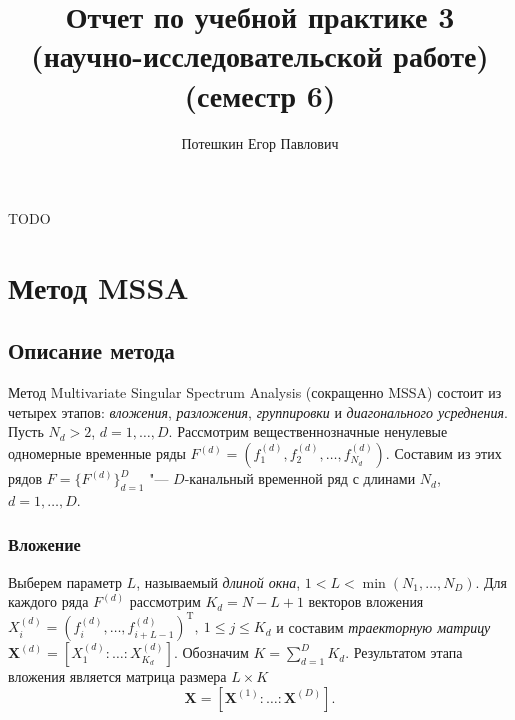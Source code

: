 \documentclass[specialist,
substylefile = spbu_report.rtx,
subf,href,colorlinks=true, 12pt]{disser}
\newcommand{\traj}{\mathbf{X}}
\newcommand{\transponse}{^\mathrm{T}}
\theoremstyle{definition}
\begin{document}
	
	\title{Отчет по учебной практике 3 (научно-исследовательской работе) (семестр 6)}
	
	
	\author{Потешкин Егор Павлович}
	
	
	\date{\number\year}
	
	\maketitle
	\tableofcontents
	\intro
	TODO
	
	
	\chapter{Метод MSSA}
	\section{Описание метода}
	Метод Multivariate Singular Spectrum Analysis (сокращенно MSSA) состоит из четырех этапов: \textit{вложения}, \textit{разложения}, \textit{группировки} и \textit{диагонального усреднения}.
	Пусть $N_d>2$, $d=1,\ldots,D$. Рассмотрим вещественнозначные ненулевые одномерные временные ряды $F^{(d)}=(f_1^{(d)}, f_2^{(d)},\ldots, f_{N_d}^{(d)})$. Составим из этих рядов $F=\{F^{(d)}\}_{d=1}^D$ "--- $D$-канальный временной ряд с длинами $N_d$, $d=1,\dots,D$. 
	\subsection{Вложение}\label{sect:embedding}
	Выберем параметр $L$, называемый \textit{длиной окна}, $1<L<\min(N_1,\ldots,N_D)$. Для каждого ряда $F^{(d)}$ рассмотрим $K_d=N-L+1$ векторов вложения
	$X_i^{(d)}=(f_{i}^{(d)},\ldots, f_{i+L-1}^{(d)})\transponse,\ 1\leqslant j \leqslant K_d$ и составим \textit{траекторную матрицу} $\traj^{(d)}=[X_1^{(d)}:\ldots:X_{K_d}^{(d)}]$. Обозначим $K=\sum_{d=1}^D K_d$. Результатом этапа вложения является матрица размера $L\times K$
	\begin{equation}\label{eq:traj}
	\traj=[\traj^{(1)}:\ldots:\traj^{(D)}].
	\end{equation}
\end{document}
